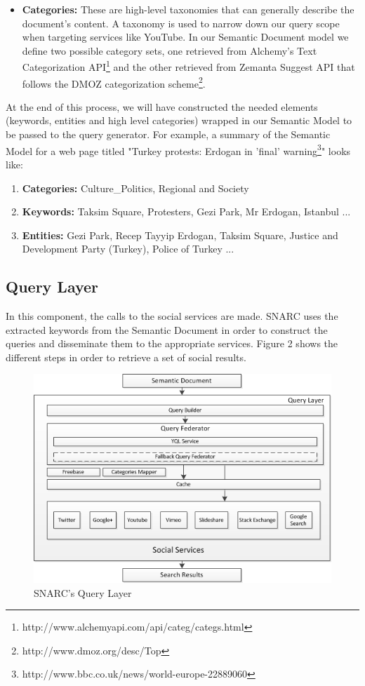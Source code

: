 \documentclass[oribibl]{llncs}
\begin{document}
\begin{enumerate}
\begin{itemize}
\item {\bf Categories:} These are high-level taxonomies that can generally describe the document's content. A taxonomy is used to narrow down our query scope when targeting services like YouTube. In our Semantic Document model we define two possible category sets, one retrieved from Alchemy's Text Categorization API\footnote{http://www.alchemyapi.com/api/categ/categs.html} and the other retrieved from Zemanta Suggest API that follows the DMOZ categorization scheme\footnote{http://www.dmoz.org/desc/Top}.
\end{itemize}
\end{enumerate}
At the end of this process, we will have constructed the needed elements (keywords, entities and high level categories) wrapped in our Semantic Model to be passed to the query generator. For example, a summary of the Semantic Model for a web page titled "Turkey protests: Erdogan in 'final' warning\footnote{http://www.bbc.co.uk/news/world-europe-22889060}"  looks like: 
\begin{enumerate}
\item {\bf Categories:} Culture\_Politics, Regional and Society
\item {\bf Keywords:} Taksim Square, Protesters, Gezi Park, Mr Erdogan, Istanbul ...
\item {\bf Entities:} Gezi Park, Recep Tayyip Erdogan, Taksim Square, Justice and Development Party (Turkey), Police of Turkey ...
\end{enumerate}

\subsection{Query Layer}
In this component, the calls to the social services are made. SNARC uses the extracted keywords from the Semantic Document in order to construct the queries and disseminate them to the appropriate services. Figure 2 shows the different steps in order to retrieve a set of social results.
\begin{figure}[h!]
  \centering
    \includegraphics[scale=0.75]{architecture-part2.png}
  \caption{SNARC's Query Layer}
\end{figure}
\end{document}
